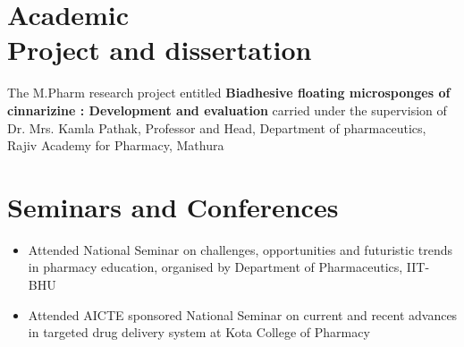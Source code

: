 \documentclass[margin,line]{res}
\begin{document}
\begin{resume}


\section{\sc Academic \\Project and dissertation}

The M.Pharm research project entitled { \bf Biadhesive floating microsponges of cinnarizine : Development and evaluation} carried under the supervision of Dr. Mrs. Kamla Pathak, Professor and Head, Department of pharmaceutics, Rajiv Academy for Pharmacy, Mathura\\



\section{\sc Seminars and Conferences}

\begin{itemize}[leftmargin=.1in]
\setlength\itemsep{-1em}

\item Attended National Seminar on challenges, opportunities and futuristic trends in pharmacy education, organised by Department of Pharmaceutics, IIT- BHU \\
\item Attended AICTE sponsored National Seminar on current and recent advances in targeted drug delivery system at Kota College of Pharmacy \\

\end{itemize}



\end{resume}
\end{document}
